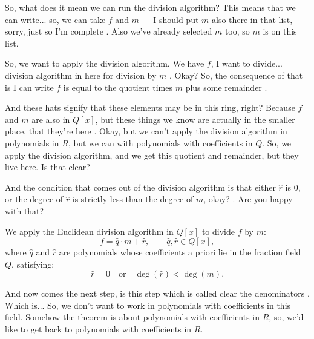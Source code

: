 \begin{proofWrapper}
\begin{speech}[00:21:05 - 00:23:05]
So, what does it mean we can run the division algorithm? This means that we can write... so, we can take $f$ and $m$ --- I should put $m$ also there in that list, sorry, just so I'm complete . Also we've already selected $m$ too, so $m$ is on this list.

So, we want to apply the division algorithm. We have $f$, I want to divide... division algorithm in here for division by $m$ . Okay? So, the consequence of that is I can write $f$ is equal to the quotient times $m$ plus some remainder .

And these hats signify that these elements may be in this ring, right?  Because $f$ and $m$ are also in $Q[x]$, but these things we know are actually in the smaller place, that they're here . Okay, but we can't apply the division algorithm in polynomials in $R$, but we can with polynomials with coefficients in $Q$. So, we apply the division algorithm, and we get this quotient and remainder, but they live here. Is that clear?

And the condition that comes out of the division algorithm is that either $\hat{r}$ is $0$, or the degree of $\hat{r}$ is strictly less than the degree of $m$, okay? . Are you happy with that?
\end{speech}

\begin{content}
We apply the Euclidean division algorithm in $Q[x]$ to divide $f$ by $m$:
\begin{equation}\label{eq:division-f-by-m}
f = \hat{q} \cdot m + \hat{r}, \qquad \hat{q}, \hat{r} \in Q[x],
\end{equation}
where $\hat{q}$ and $\hat{r}$ are polynomials whose coefficients a priori lie in the fraction field $Q$, satisfying:
\begin{equation}\label{eq:degree-remainder-cond}
\hat{r} = 0 \quad \text{or} \quad \deg(\hat{r}) < \deg(m).
\end{equation}
\end{content}

\begin{speech}[00:23:05 - 00:24:54]
And now comes the next step, is this step which is called clear the denominators . Which is... So, we don't want to work in polynomials with coefficients in this field. Somehow the theorem is about polynomials with coefficients in $R$, so, we'd like to get back to polynomials with coefficients in $R$.


\end{speech}
\end{proofWrapper}
